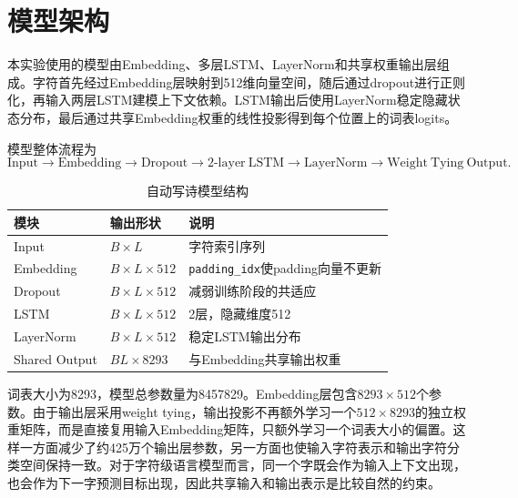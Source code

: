 \documentclass[11pt]{article}
\begin{document}
	\section{模型架构}
	本实验使用的模型由Embedding、多层LSTM、LayerNorm和共享权重输出层组成。字符首先经过Embedding层映射到512维向量空间，随后通过dropout进行正则化，再输入两层LSTM建模上下文依赖。LSTM输出后使用LayerNorm稳定隐藏状态分布，最后通过共享Embedding权重的线性投影得到每个位置上的词表logits。

	模型整体流程为
	\[
		\mathrm{Input}
		\rightarrow \mathrm{Embedding}
		\rightarrow \mathrm{Dropout}
		\rightarrow \mathrm{2\mbox{-}layer\ LSTM}
		\rightarrow \mathrm{LayerNorm}
		\rightarrow \mathrm{Weight\ Tying\ Output}.
	\]

	\begin{table}[H]
		\centering
		\caption{自动写诗模型结构}
		\begin{tabular}{M{3.4cm} M{3.8cm} M{5.5cm}}
			\toprule
			模块 & 输出形状 & 说明 \\
			\midrule
			Input & $B\times L$ & 字符索引序列 \\
			Embedding & $B\times L\times512$ & \texttt{padding\_idx}使padding向量不更新 \\
			Dropout & $B\times L\times512$ & 减弱训练阶段的共适应 \\
			LSTM & $B\times L\times512$ & 2层，隐藏维度512 \\
			LayerNorm & $B\times L\times512$ & 稳定LSTM输出分布 \\
			Shared Output & $B L\times8293$ & 与Embedding共享输出权重 \\
			\bottomrule
		\end{tabular}
	\end{table}

	词表大小为8293，模型总参数量为8457829。Embedding层包含$8293\times512$个参数。由于输出层采用weight tying，输出投影不再额外学习一个$512\times8293$的独立权重矩阵，而是直接复用输入Embedding矩阵，只额外学习一个词表大小的偏置。这样一方面减少了约425万个输出层参数，另一方面也使输入字符表示和输出字符分类空间保持一致。对于字符级语言模型而言，同一个字既会作为输入上下文出现，也会作为下一字预测目标出现，因此共享输入和输出表示是比较自然的约束。
\end{document}
